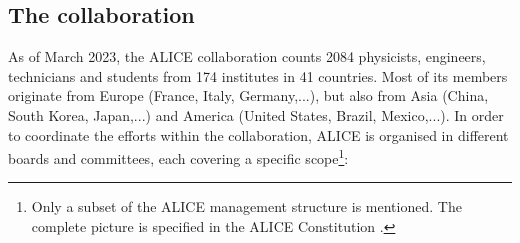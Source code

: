 \subsection{The collaboration}

As of March 2023, the ALICE collaboration counts 2084 physicists, engineers, technicians and students from 174 institutes in 41 countries. Most of its members originate from Europe (France, Italy, Germany,...), but also from Asia (China, South Korea, Japan,...) and America (United States, Brazil, Mexico,...). In order to coordinate the efforts within the collaboration, ALICE is organised in different boards and committees, each covering a specific scope\footnote{Only a subset of the ALICE management structure is mentioned. The complete picture is specified in the ALICE Constitution \cite{alicecollaborationOverviewCollaboration2023}.}:

